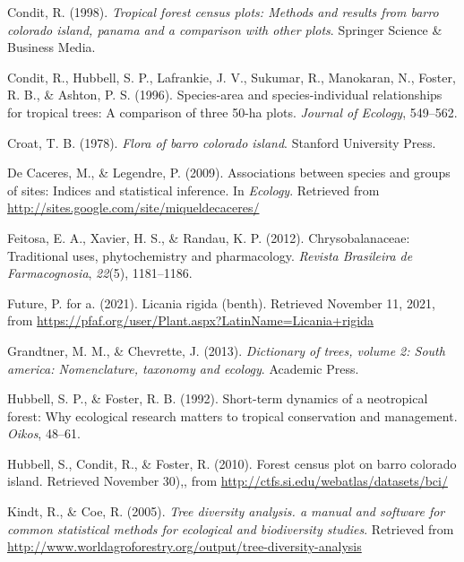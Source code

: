 \documentclass[11pt,]{article}
\begin{document}
\hypertarget{ref-condit1998tropical}{}
Condit, R. (1998). \emph{Tropical forest census plots: Methods and
results from barro colorado island, panama and a comparison with other
plots}. Springer Science \& Business Media.

\hypertarget{ref-condit1996species}{}
Condit, R., Hubbell, S. P., Lafrankie, J. V., Sukumar, R., Manokaran,
N., Foster, R. B., \& Ashton, P. S. (1996). Species-area and
species-individual relationships for tropical trees: A comparison of
three 50-ha plots. \emph{Journal of Ecology}, 549--562.

\hypertarget{ref-croat1978flora}{}
Croat, T. B. (1978). \emph{Flora of barro colorado island}. Stanford
University Press.

\hypertarget{ref-indicspeciesR}{}
De Caceres, M., \& Legendre, P. (2009). Associations between species and
groups of sites: Indices and statistical inference. In \emph{Ecology}.
Retrieved from \url{http://sites.google.com/site/miqueldecaceres/}

\hypertarget{ref-feitosa2012chrysobalanaceae}{}
Feitosa, E. A., Xavier, H. S., \& Randau, K. P. (2012).
Chrysobalanaceae: Traditional uses, phytochemistry and pharmacology.
\emph{Revista Brasileira de Farmacognosia}, \emph{22}(5), 1181--1186.

\hypertarget{ref-PfafLrigida}{}
Future, P. for a. (2021). Licania rigida (benth). Retrieved November 11,
2021, from
\url{https://pfaf.org/user/Plant.aspx?LatinName=Licania+rigida}

\hypertarget{ref-grandtner2013dictionary}{}
Grandtner, M. M., \& Chevrette, J. (2013). \emph{Dictionary of trees,
volume 2: South america: Nomenclature, taxonomy and ecology}. Academic
Press.

\hypertarget{ref-hubbell1992short}{}
Hubbell, S. P., \& Foster, R. B. (1992). Short-term dynamics of a
neotropical forest: Why ecological research matters to tropical
conservation and management. \emph{Oikos}, 48--61.

\hypertarget{ref-Hubbell2010Forest}{}
Hubbell, S., Condit, R., \& Foster, R. (2010). Forest census plot on
barro colorado island. Retrieved November 30),, from
\url{http://ctfs.si.edu/webatlas/datasets/bci/}

\hypertarget{ref-biodiversityR}{}
Kindt, R., \& Coe, R. (2005). \emph{Tree diversity analysis. a manual
and software for common statistical methods for ecological and
biodiversity studies}. Retrieved from
\url{http://www.worldagroforestry.org/output/tree-diversity-analysis}
\end{document}
